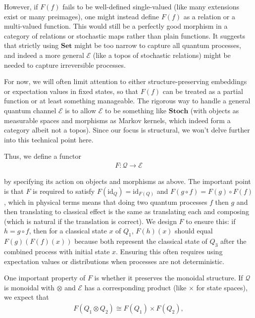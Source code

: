 \medskip

However, if $F(f)$ fails to be well-defined single-valued (like many extensions exist or many preimages), one might instead define $F(f)$ as a relation or a multi-valued function. This would still be a perfectly good morphism in a category of relations or stochastic maps rather than plain functions. It suggests that strictly using $\mathbf{Set}$ might be too narrow to capture all quantum processes, and indeed a more general $\mathcal{E}$ (like a topos of stochastic relations) might be needed to capture irreversible processes.

\medskip

For now, we will often limit attention to either structure-preserving embeddings or expectation values in fixed states, so that $F(f)$ can be treated as a partial function or at least something manageable. The rigorous way to handle a general quantum channel $\mathcal{E}$ is to allow $\mathcal{E}$ to be something like $\mathbf{Stoch}$ (with objects as measurable spaces and morphisms as Markov kernels, which indeed form a category albeit not a topos). Since our focus is structural, we won't delve further into this technical point here.

\medskip

Thus, we define a functor
\begin{align}
F: \mathcal{Q} \to \mathcal{E}
\end{align}

by specifying its action on objects and morphisms as above. The important point is that $F$ is required to satisfy $F(\mathrm{id}_Q) = \mathrm{id}_{F(Q)}$ and $F(g\circ f) = F(g)\circ F(f)$, which in physical terms means that doing two quantum processes $f$ then $g$ and then translating to classical effect is the same as translating each and composing (which is natural if the translation is correct). We design $F$ to ensure this: if $h = g\circ f$, then for a classical state $x$ of $Q_1$, $F(h)(x)$ should equal $F(g)(F(f)(x))$ because both represent the classical state of $Q_3$ after the combined process with initial state $x$. Ensuring this often requires using expectation values or distributions when processes are not deterministic.

\medskip

One important property of $F$ is whether it preserves the monoidal structure. If $\mathcal{Q}$ is monoidal with $\otimes$ and $\mathcal{E}$ has a corresponding product (like $\times$ for state spaces), we expect that
\begin{align}
F(Q_1 \otimes Q_2) \cong F(Q_1) \times F(Q_2),
\end{align}

